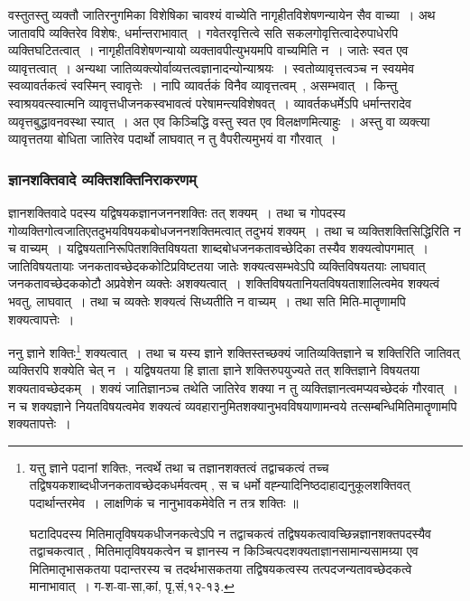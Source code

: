 \begin{small}
				वस्तुतस्तु व्यक्तौ जातिरनुगमिका विशेषिका चावश्यं वाच्येति नागृहीतविशेषणन्यायेन सैव वाच्या~। अथ जातावपि व्यक्तिरेव विशेषः, धर्मान्तराभावात्~। गवेतरवृत्तित्वे सति सकलगोवृत्तित्वादेरुपाधेरपि व्यक्तिघटितत्वात्~। नागृहीतविशेषणन्यायो व्यक्तावपीत्युभयमपि वाच्यमिति न~। जातेः स्वत एव व्यावृत्तत्वात्~। अन्यथा जातिव्यक्त्योर्वाव्यत्तत्वज्ञानादन्योन्याश्रयः~। स्वतोव्यावृत्तत्वञ्च न स्वयमेव स्वव्यावर्तकत्वं स्वस्मिन् स्वावृत्तेः~। नापि व्यावर्तकं विनैव व्यावृत्तत्वम्~, असम्भवात्~। किन्तु स्वाश्रयवत्स्वात्मनि व्यावृत्तधीजनकस्वभावत्वं परेषामन्त्यविशेषवत्~। व्यावर्तकधर्मेऽपि धर्मान्तरादेव व्यवृत्तबुद्धावनवस्था स्यात्~। अत एव किञ्चिद्धि वस्तु स्वत एव विलक्षणमित्याहुः~। अस्तु वा व्यक्त्या व्यावृत्ततया बोधिता जातिरेव पदार्थो लाघवात् न तु वैपरीत्यमुभयं वा गौरवात्~। 
			\end{small}

			\subsubsection{ज्ञानशक्तिवादे व्यक्तिशक्तिनिराकरणम्}

				ज्ञानशक्तिवादे पदस्य यद्विषयकज्ञानजननशक्तिः तत् शक्यम्~। तथा च गोपदस्य गोव्यक्तिगोत्वजातिएतदुभयविषयकबोधजननशक्तिमत्वात् तदुभयं शक्यम्~। तथा च व्यक्तिशक्तिसिद्धिरिति न च वाच्यम्~। यद्विषयतानिरूपितशक्तिविषयता शाब्दबोधजनकतावच्छेदिका तस्यैव शक्यत्वोपगमात्~। जातिविषयतायाः जनकतावच्छेदककोटिप्रविष्टतया जातेः शक्यत्वसम्भवेऽपि व्यक्तिविषयतयाः लाघवात् जनकतावच्छेदककोटौ अप्रवेशेन व्यक्तेः अशक्यत्वात्~। शक्तिविषयतानियतविषयताशालित्वमेव शक्यत्वं भवतु, लाघवात्~। तथा च व्यक्तेः  शक्यत्वं सिध्यतीति न वाच्यम्~। तथा सति मिति-मातॄणामपि शक्यत्वापत्तेः~।

				\begin{small}
				
					ननु ज्ञाने शक्तिः\footnote{यत्तु ज्ञाने पदानां शक्तिः, नत्वर्थे तथा च तज्ञानशक्तत्वं तद्वाचकत्वं  तच्च तद्विषयकशाब्दधीजनकतावच्छेदकधर्मवत्वम् , स च धर्मो वह्न्यादिनिष्ठदाहाद्यनुकूलशक्तिवत्  पदार्थान्तरमेव~। लाक्षणिकं च नानुभावकमेवेति न तत्र शक्तिः ॥
					
					घटादिपदस्य मितिमातृविषयकधीजनकत्वेऽपि न तद्वाचकत्वं तद्विषयकत्वावच्छिन्नज्ञानशक्तपदस्यैव  तद्वाचकत्वात् , मितिमातृविषयकत्वेन च ज्ञानस्य न  किञ्चित्पदशक्यताज्ञानसामान्यसामग्र्या एव मितिमातृभासकतया  पदान्तरस्य च तदर्थभासकतया  तद्विषयकत्वस्य  तत्पदजन्यतावच्छेदकत्वे  मानाभावात्~। ग-श-वा-सा,कां, पृ,सं,१२-१३.} शक्यत्वात्~। तथा च यस्य ज्ञाने शक्तिस्तच्छक्यं जातिव्यक्तिज्ञाने च शक्तिरिति जातिवत् व्यक्तिरपि शक्येति चेत् न~। यद्विषयतया हि ज्ञाता ज्ञाने शक्तिरुपयुज्यते तत् शक्तिज्ञाने विषयतया शक्यतावच्छेदकम्~। शक्यं जातिज्ञानञ्च तथेति जातिरेव शक्या न तु व्यक्तिज्ञानत्वमप्यवच्छेदकं गौरवात्~। न च शक्यज्ञाने नियतविषयत्वमेव शक्यत्वं व्यवहारानुमितशक्यानुभवविषयाणामन्वये तत्सम्बन्धिमितिमातॄणामपि शक्यतापत्तेः~। 					
				\end{small}	

